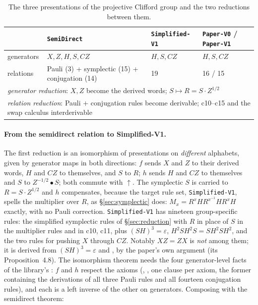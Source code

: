 \begin{table}[h]
\caption{The three presentations of the projective Clifford group and
the two reductions between them.}
\label{tab:plumb}
\centering\scriptsize
\setlength{\tabcolsep}{4pt}
\begin{tabular}{llll}
\toprule
 & \texttt{SemiDirect} & \texttt{Simplified-V1} & \texttt{Paper-V0} / \texttt{Paper-V1} \\
\midrule
generators & $X, Z, H, S, CZ$ & $H, S, CZ$ & $H, S, CZ$ \\
relations  & Pauli (3) + symplectic (15) + conjugation (14) & 19 & 16 / 15 \\
\midrule
\multicolumn{4}{l}{\emph{generator reduction}: $X, Z$ become the derived words; $S \mapsto R = S\cdot Z^{1/2}$}\\
\multicolumn{4}{l}{\emph{relation reduction}: Pauli $+$ conjugation rules become derivable; c10--c15 and the swap calculus interderivable}\\
\bottomrule
\end{tabular}
\end{table}

\paragraph{From the semidirect relation to Simplified-V1.}  The first
reduction is an isomorphism of presentations on \emph{different}
alphabets, given by generator maps in both directions: $f$ sends $X$
and $Z$ to their derived words, $H$ and $CZ$ to themselves, and $S$ to
$R$; $h$ sends $H$ and $CZ$ to themselves and $S$ to $Z^{-1/2} \bullet
S$; both commute with $\uparrow$.  The symplectic $S$ is carried to
$R = S \cdot Z^{1/2}$ and $h$ compensates, because the target rule set,
\texttt{Simplified-V1}, spells the multiplier over $R$, as
\S\ref{sec:symplectic} does: $M_x = R^{x}HR^{x^{-1}}HR^{x}H$ exactly, with no Pauli
correction.  \texttt{Simplified-V1} has nineteen group-specific rules:
the simplified symplectic rules of \S\ref{sec:reduction} with $R$ in
place of $S$ in the multiplier rules and in c10, c11, plus
$(SH)^3 = \varepsilon$, $H^2SH^2S = SH^2SH^2$, and the two rules for
pushing $X$ through $CZ$.  Notably $XZ = ZX$ is \emph{not} among them;
it is derived from $(SH)^3 = \varepsilon$ and , by the
paper's own argument (its Proposition~4.8).  The isomorphism theorem
needs the four generator-level facts of the library's
: $f$ and $h$ respect the axioms
(, , one clause per axiom, the
former containing the derivations of all three Pauli rules and all
fourteen conjugation rules), and each is a left inverse of the other on
generators.  Composing with the semidirect theorem:

